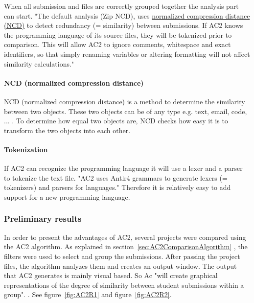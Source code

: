 \documentclass[a4paper, 11pt]{article}
\renewcommand{\\}{\vspace*{0.5\baselineskip} \newline}
\begin{document}
When all submission and files are correctly grouped together the analysis part can start. "The default analysis (Zip NCD), uses \hyperref[sec:NCD]{normalized compression distance (NCD)} to detect redundancy (= similarity) between submissions. If AC2 knows the programming language of its source files, they will be tokenized prior to comparison. This will allow AC2 to ignore comments, whitespace and exact identifiers, so that simply renaming variables or altering formatting will not affect similarity calculations." \autocite{AC2wiki} 

\paragraph{NCD (normalized compression distance)}
\label{sec:NCD}

NCD (normalized compression distance) is a method to determine the similarity between two objects. These two objects can be of any type e.g. text, email, code, ... .  To determine how equal two objects are, NCD checks how easy it is to transform the two objects into each other.

\paragraph{Tokenization}

If AC2 can recognize the programming language it will use a lexer and a parser to tokenize the text file. "AC2 uses Antlr4 grammars to generate lexers (= tokenizers) and parsers for languages." \autocite{AC2wiki} Therefore it is relatively easy to add support for a new programming language.

\subsubsection{Preliminary results}

In order to present the advantages of AC2, several projects were compared using the AC2 algorithm. As explained in section~\ref{sec:AC2ComparisonAlgorithm} , the filters were used to select and group the submissions. After passing the project files, the algorithm analyzes them and creates an output window. The output that AC2 generates is mainly visual based. So Ac "will create graphical representations of the degree of similarity between student submissions within a group". \autocite{AC2}. See figure~\ref{fig:AC2R1} and figure~\ref{fig:AC2R2}.
\end{document}
